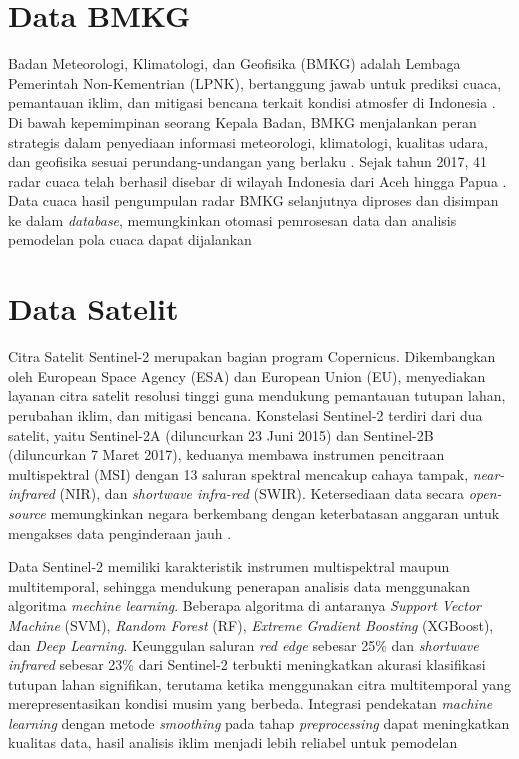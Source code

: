 \section{Data BMKG}
Badan Meteorologi, Klimatologi, dan Geofisika (BMKG) adalah Lembaga Pemerintah Non-Kementrian (LPNK), bertanggung jawab untuk prediksi cuaca, pemantauan iklim, dan mitigasi bencana terkait kondisi atmosfer di Indonesia \parencite{sujalu2020}. Di bawah kepemimpinan seorang Kepala Badan, BMKG menjalankan peran strategis dalam penyediaan informasi meteorologi, klimatologi, kualitas udara, dan geofisika sesuai perundang-undangan yang berlaku \parencite{boy2020}. Sejak tahun 2017, 41 radar cuaca telah berhasil disebar di wilayah Indonesia dari Aceh hingga Papua \parencite{prakarsa2019}. Data cuaca hasil pengumpulan radar BMKG selanjutnya diproses dan disimpan ke dalam \textit{database}, memungkinkan otomasi pemrosesan data dan analisis pemodelan pola cuaca dapat dijalankan

\section{Data Satelit}
Citra Satelit Sentinel-2 merupakan bagian program Copernicus. Dikembangkan oleh European Space Agency (ESA) dan European Union (EU), menyediakan layanan citra satelit resolusi tinggi guna mendukung pemantauan tutupan lahan, perubahan iklim, dan mitigasi bencana. Konstelasi Sentinel-2 terdiri dari dua satelit, yaitu Sentinel-2A (diluncurkan 23 Juni 2015) dan Sentinel-2B (diluncurkan 7 Maret 2017), keduanya membawa instrumen pencitraan multispektral (MSI) dengan 13 saluran spektral mencakup cahaya tampak, \textit{near-infrared} (NIR), dan \textit{shortwave infra-red} (SWIR). Ketersediaan data secara \textit{open-source} memungkinkan negara berkembang dengan keterbatasan anggaran untuk mengakses data penginderaan jauh \parencite{phiri2020}.

Data Sentinel-2 memiliki karakteristik instrumen multispektral maupun multitemporal, sehingga mendukung penerapan analisis data menggunakan algoritma \textit{mechine learning}. Beberapa algoritma di antaranya \textit{Support Vector Machine} (SVM), \textit{Random Forest} (RF), \textit{Extreme Gradient Boosting} (XGBoost), dan \textit{Deep Learning}. Keunggulan saluran \textit{red edge} sebesar 25\% dan \textit{shortwave infrared} sebesar 23\% dari Sentinel-2 terbukti meningkatkan akurasi klasifikasi tutupan lahan signifikan, terutama ketika menggunakan citra multitemporal yang merepresentasikan kondisi musim yang berbeda. Integrasi pendekatan \textit{machine learning} dengan metode \textit{smoothing} pada tahap \textit{preprocessing} dapat meningkatkan kualitas data, hasil analisis iklim menjadi lebih reliabel untuk pemodelan \parencite{abdi2020}

